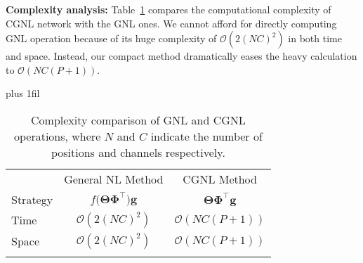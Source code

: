 \documentclass{article}
\begin{document}
\begin{table}[ht]
  \begin{minipage}[h]{0.54\textwidth}
    \textbf{Complexity analysis:}
    Table~\ref{table:computation complexity} compares the computational complexity of CGNL network with the GNL ones.
    We cannot afford for directly computing GNL operation because of its huge complexity of $\mathcal{O}(2(NC)^2)$ in both time and space.
    Instead, our compact method dramatically eases the heavy calculation to $\mathcal{O}(NC(P+1))$.
  \end{minipage} \hskip 5pt plus 1fil
  \begin{minipage}[h]{0.42\textwidth}
  \caption{\small{
    Complexity comparison of GNL and CGNL operations, where $N$ and $C$ indicate the number of positions and channels respectively.
  }}
  \centering
  \scriptsize
  \begin{tabular}[h]{lcc}
    \toprule
    & General NL Method  & CGNL Method \\
    \cmidrule(r){2-3}
    Strategy    & $f\big(\bm{\Theta} \bm{\Phi}^\top\big) \bm{g}$  & $\bm{\Theta} \bm{\Phi}^\top \bm{g}$ \\
    Time        & $\mathcal{O}(2(NC)^2)$                          & $\mathcal{O}(NC(P+1))$   \\
    Space       & $\mathcal{O}(2(NC)^2)$                          & $\mathcal{O}(NC(P+1))$   \\
    \bottomrule
  \label{table:computation complexity}
  \end{tabular}
  \end{minipage}
\end{table}
%
%
%
%
\end{document}
